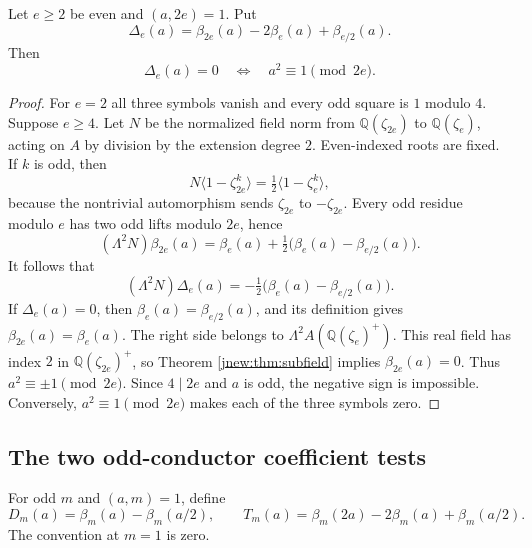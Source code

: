 \begin{lemma}\label{jnew:lem:even-difference}
Let $e\ge2$ be even and $(a,2e)=1$. Put
\[
 \Delta_e(a)=\beta_{2e}(a)-2\beta_e(a)+\beta_{e/2}(a).
\]
Then
\begin{equation}\label{jnew:eq:Delta-zero}
 \Delta_e(a)=0
 \quad\Longleftrightarrow\quad a^2\equiv1\pmod{2e}.
\end{equation}
\end{lemma}
\begin{proof}
For $e=2$ all three symbols vanish and every odd square is $1$
modulo $4$. Suppose $e\ge4$. Let $N$ be the normalized field norm
from $\mathbb Q(\zeta_{2e})$ to $\mathbb Q(\zeta_e)$, acting on
$A$ by division by the extension degree $2$. Even-indexed roots
are fixed. If $k$ is odd, then
\[
 N\langle1-\zeta_{2e}^k\rangle
 =\tfrac12\langle1-\zeta_e^k\rangle,
\]
because the nontrivial automorphism sends $\zeta_{2e}$ to
$-\zeta_{2e}$. Every odd residue modulo $e$ has two odd lifts
modulo $2e$, hence
\begin{equation}\label{jnew:eq:dyadic-norm}
 (\Lambda^2N)\beta_{2e}(a)
 =\beta_e(a)+\tfrac12\bigl(\beta_e(a)-\beta_{e/2}(a)\bigr).
\end{equation}
It follows that
\[
 (\Lambda^2N)\Delta_e(a)
 =-\tfrac12\bigl(\beta_e(a)-\beta_{e/2}(a)\bigr).
\]
If $\Delta_e(a)=0$, then $\beta_e(a)=\beta_{e/2}(a)$, and its
definition gives $\beta_{2e}(a)=\beta_e(a)$. The right side belongs
to $\Lambda^2 A(\mathbb Q(\zeta_e)^+)$. This real field has index
$2$ in $\mathbb Q(\zeta_{2e})^+$, so Theorem
\ref{jnew:thm:subfield} implies $\beta_{2e}(a)=0$.
Thus $a^2\equiv\pm1\pmod{2e}$. Since $4\mid2e$ and $a$ is odd,
the negative sign is impossible. Conversely,
$a^2\equiv1\pmod{2e}$ makes each of the three symbols zero.
\end{proof}

\subsection{The two odd-conductor coefficient tests}

For odd $m$ and $(a,m)=1$, define
\[
 D_m(a)=\beta_m(a)-\beta_m(a/2),\qquad
 T_m(a)=\beta_m(2a)-2\beta_m(a)+\beta_m(a/2).
\]
The convention at $m=1$ is zero.

